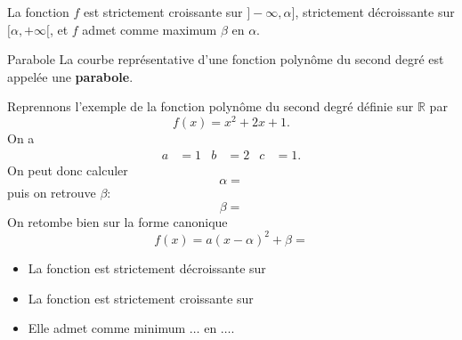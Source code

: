 \documentclass[11pt]{article}
\begin{document}
\begin{prop}
\begin{minipage}[t]{.47\textwidth}
\begin{center}
    \end{center}
  La fonction $f$ est strictement croissante sur $]-\infty, \alpha]$,
  strictement décroissante sur $[\alpha, +\infty[$, et $f$ admet comme maximum
    $\beta$ en $\alpha$.
    \begin{center}
    \end{center}
  \end{minipage}
\end{prop}

\begin{defi}{Parabole}
  La courbe représentative d'une fonction polynôme du second degré est appelée
  une \textbf{parabole}.
\end{defi}

\begin{exemple}
  Reprennons l'exemple de la fonction polynôme du second degré définie sur
  $\mathbb{R}$ par
  \[
    f(x) = x^2+2x+1.
  \]
  On a
  \begin{align*}
    a &= 1 &
    b &= 2 &
    c &= 1.
  \end{align*}
  On peut donc calculer
  \[
    \alpha =
  \]
  puis on retrouve $\beta$:
  \[
    \beta =
  \]
  On retombe bien sur la forme canonique
  \[
    f(x) = a(x-\alpha)^2+\beta =
  \]
\begin{itemize}
\item La fonction est strictement décroissante sur
\item La fonction est strictement croissante sur
\item Elle admet comme minimum $\ldots$ en $\ldots$.
\end{itemize}
 \begin{center}
\end{center}
\end{exemple}
\end{document}
